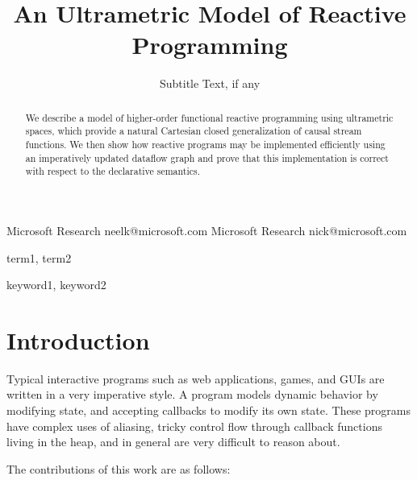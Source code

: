\documentclass[preprint]{sigplanconf}
\begin{document}
\copyrightdata{[to be supplied]} 


\title{An Ultrametric Model of Reactive Programming}
\subtitle{Subtitle Text, if any}

           {Microsoft Research}
           {neelk@microsoft.com}
           {Microsoft Research}
           {nick@microsoft.com}

\maketitle

\begin{abstract}
We describe a model of higher-order functional reactive programming
using ultrametric spaces, which provide a natural Cartesian closed
generalization of causal stream functions. We then show how reactive
programs may be implemented efficiently using an imperatively updated
dataflow graph and prove that this implementation is correct with
respect to the declarative semantics.
\end{abstract}

\newtheorem{prop}{Proposition}
\newtheorem{lemma}{Lemma}


\terms
term1, term2

\keywords
keyword1, keyword2

\section{Introduction}

Typical interactive programs such as web applications, games, and GUIs
are written in a very imperative style. A program models dynamic
behavior by modifying state, and accepting callbacks to modify its own
state. These programs have complex uses of aliasing, tricky control
flow through callback functions living in the heap, and in general are
very difficult to reason about.



The contributions of this work are as follows:
\end{document}
